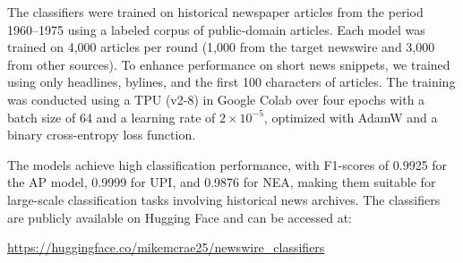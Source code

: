 \documentclass{article}
\begin{document}
The classifiers were trained on historical newspaper articles from the period 1960--1975 using a labeled corpus of public-domain articles. Each model was trained on 4,000 articles per round (1,000 from the target newswire and 3,000 from other sources). To enhance performance on short news snippets, we trained using only headlines, bylines, and the first 100 characters of articles. The training was conducted using a TPU (v2-8) in Google Colab over four epochs with a batch size of 64 and a learning rate of $2 \times 10^{-5}$, optimized with AdamW and a binary cross-entropy loss function.

The models achieve high classification performance, with F1-scores of 0.9925 for the AP model, 0.9999 for UPI, and 0.9876 for NEA, making them suitable for large-scale classification tasks involving historical news archives. The classifiers are publicly available on Hugging Face and can be accessed at:

\begin{center}
\url{https://huggingface.co/mikemcrae25/newswire_classifiers}
\end{center}
\end{document}
